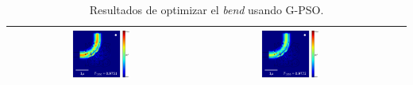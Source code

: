 \begin{table}[ht]
\begin{tabular}{|c|c|c|c|}
      \includegraphics[width=0.33\textwidth]{image/results/bend/PSO/visualize_field_disc_512.png} &
      \includegraphics[width=0.33\textwidth]{image/results/bend/PSO/visualize_field_fab_512.png} \\
    \hline
    \end{tabular}
    \hspace*{-3cm}
    \caption{Resultados de optimizar el \emph{bend} usando G-PSO.}
    \label{tab:opt-PSO-bend}
\end{table}

